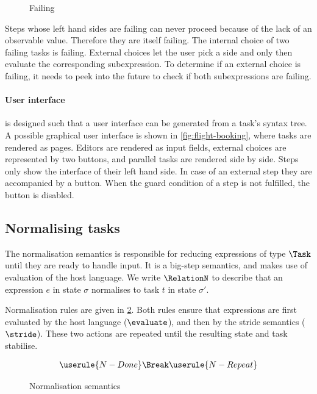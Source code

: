 \begin{figure}[h]
  \small
  \caption{Failing} \label{fig:observation-failing}
\end{figure}

Steps whose left hand sides are failing can never proceed because of the lack of an observable value.
Therefore they are itself failing.
The internal choice of two failing tasks is failing.
External choices let the user pick a side and only then evaluate the corresponding subexpression.
To determine if an external choice is failing, it needs to peek into the future to check if both subexpressions are failing.



\paragraph{User interface}

\TOPHAT is designed such that a user interface can be generated from a task's syntax tree.
A possible graphical user interface is shown in \cref{fig:flight-booking}, where tasks are rendered as \HTML pages.
Editors are rendered as input fields,
external choices are represented by two buttons,
and parallel tasks are rendered side by side.
Steps only show the interface of their left hand side.
In case of an external step they are accompanied by a button.
When the guard condition of a step is not fulfilled, the button is disabled.



\subsection{Normalising tasks}
\label{sec:normalise}

The normalisation semantics is responsible for reducing expressions of type $\Task$ until they are ready to handle input.
It is a big-step semantics, and makes use of evaluation of the host language.
We write $\RelationN$ to describe that
an expression $e$ in state $\sigma$ normalises to task $t$ in state $\sigma'$.

Normalisation rules are given in \cref{fig:normalisation-semantics}.
Both rules ensure that expressions are first evaluated by the host language ($\evaluate$), and then by the stride semantics ($\stride$).
These two actions are repeated until the resulting state and task stabilise.

\begin{figure}[h]
  \small

  \boxed{\RelationN}
  \begin{gather*}
    \userule{N-Done} \Break
    \userule{N-Repeat}
  \end{gather*}
  \caption{Normalisation semantics} \label{fig:normalisation-semantics}

\end{figure}

